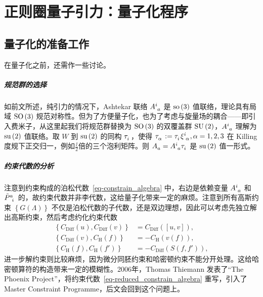 
\chapter{正则圈量子引力：量子化程序}

	\label{chp-Quantization}
	\section{量子化的准备工作}

		\label{sec-pre}
		在量子化之前，还需作一些讨论。

		\paragraph{规范群的选择} 如前文所述，纯引力的情况下，Ashtekar 联络 $\tensor{A}{^i_a}$ 是 $\mathrm{so}\left( 3 \right)$ 值联络，理论具有局域 $\mathrm{SO}\left(3\right)$ 规范对称性。但为了方便量子化，也为了考虑与旋量场的耦合——即引入费米子，从这里起我们将规范群替换为 $\mathrm{SO}\left(3\right)$ 的双覆盖群 $\mathrm{SU}\left(2\right)$，$\tensor{A}{^i_a}$ 理解为 $\mathrm{su}\left( 2 \right)$ 值联络。取 $W$ 到 $\mathrm{su}\left( 2 \right)$ 的同构 $\tensor{\tau}{_i}$，使得 $\tensor{\tau}{_\alpha} \definedby \tensor{\tau}{_i} \tensor{\xi}{^i_\alpha}, \alpha=1,2,3$ 在 Killing 度规下正交归一，例如$\frac{\ii}{2}$倍的三个泡利矩阵。则 $\tensor{A}{_a} = \tensor{A}{^i_a} \tensor{\tau}{_i}$ 是 $\mathrm{su}\left( 2 \right)$ 值一形式。


		\paragraph{约束代数的分析} 注意到约束构成的泊松代数~\eqref{eq-constrain_algebra} 中，右边是依赖变量 $\tensor{A}{^i_a}$ 和 $\tensor{\tilde{P}}{^a_i}$ 的，故约束代数并非李代数，这给量子化带来一定的麻烦。注意到所有高斯约束 $\left\{ G(\Lambda) \right\}$ 不仅是泊松代数的子代数，还是双边理想，因此可以考虑先独立解出高斯约束，然后考虑约化约束代数
		\begin{equation}
			\begin{split}
				\left\{ C_{\mathrm{Diff}}(u), C_{\text{Diff}}(v) \right\} &= C_{\text{Diff}}([u,v]),\\
				\left\{ C_{\text{Diff}}(v), C_{\text{H}}(f) \right\} &= - C_{\text{H}}(v(f)),\\
				\left\{ C_{\text{H}}(f), C_{\text{H}}(f') \right\} &= - C_{\text{Diff}}(S(f,f')),\label{eq-reduced_constrain_algebra}
			\end{split}
		\end{equation}
		进一步解约束则比较麻烦，因为微分同胚约束和哈密顿约束不能分开处理。这给哈密顿算符的构造带来一定的模糊性\cite{Han2005,Thiemann1996aw}。2006年，Thomas Thiemann 发表了“The Phoenix Project”\cite{Thiemann2003zv}，将约束代数~\eqref{eq-reduced_constrain_algebra} 重写，引入了 Master Constraint Programme，后文会回到这个问题上。

